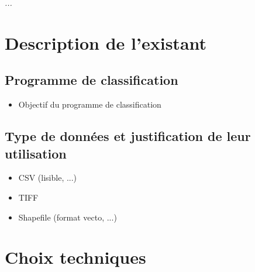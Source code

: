 
\textit{...}

\section{Description de l'existant}

\subsection{Programme de classification}
\begin{itemize}
	\item Objectif du programme de classification 
\end{itemize}

\subsection{Type de données et justification de leur utilisation}
\begin{itemize}
	\item CSV (lisible, ...)
	\item TIFF
	\item Shapefile (format vecto, ...)
\end{itemize}


\section{Choix techniques}

